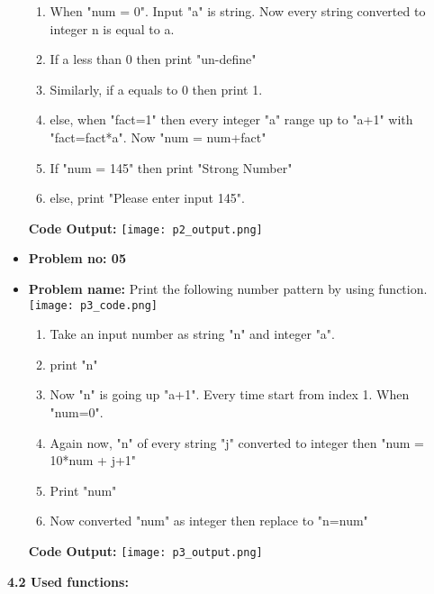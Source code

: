 \documentclass[a4paper]{article}
\begin{document}
\begin{itemize}
\begin{enumerate}
    \item When "num = 0". Input "a" is string. Now every string converted to integer n is equal to a.
    \item If a less than 0 then print "un-define"
    \item Similarly, if a equals to 0 then print 1.
    \item else, when "fact=1" then every integer "a" range up to "a+1" with "fact=fact*a". Now "num = num+fact"
    \item If "num = 145" then print "Strong Number"
    \item else, print "Please enter input 145".
\end{enumerate}

\textbf{Code Output: }
\newline
\texttt{[image: p2\_output.png]}
\newline
\item\textbf{Problem no: 05}
\item \textbf{Problem name:} Print the following number pattern by using function.
\newline
\texttt{[image: p3\_code.png]}
\begin{enumerate}
    \item Take an input number as string "n" and integer "a".
    \item print "n"
    \item Now "n" is going up "a+1". Every time start from index 1. When "num=0".
    \item Again now, "n" of every string "j" converted to integer then "num = 10*num + j+1"
    \item Print "num"
    \item Now converted "num" as integer then replace to "n=num"
\end{enumerate}
\textbf{Code Output: }
\newline
\texttt{[image: p3\_output.png]}
\newline



\end{itemize}
\textbf{4.2 Used functions:}
\end{document}

